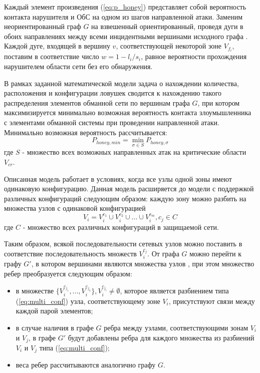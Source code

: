 Каждый элемент произведения (\ref{eq:p_honey}) представляет собой вероятность контакта нарушителя и ОбС на одном из шагов направленной атаки. Заменим неориентированный граф $G$ на взвешенный ориентированный, проведя дуги в обоих направлениях между всеми инцидентными вершинами исходного графа . Каждой дуге, входящей в вершину $v$, соответствующей некоторой зоне $V_{f_i}$, поставим в соответствие число $w = 1 - l_i / s_i$, равное вероятности прохождения нарушителем области сети  без его обнаружения.

В рамках заданной математической модели задача о нахождении количества, расположения и конфигурации ловушек сводится к нахождению такого распределения элементов обманной сети по вершинам графа $G$, при котором максимизируется минимально возможная вероятность контакта злоумышленника с элементами обманной системы при проведении направленной атаки. Минимально возможная вероятность рассчитывается:
\begin{equation}
\label{eq:p_honey_min}
P_{honey, min} = \min_{\sigma \in S} P_{honey, \sigma} 
\end{equation}
где $S$ - множество всех возможных направленных атак на критические области $V_{cr}$.

Описанная модель работает в условиях, когда все узлы одной зоны имеют одинаковую конфигурацию. Данная модель расширяется до модели с поддержкой различных конфигураций следующим образом: каждую зону можно разбить на множества узлов с одинаковой конфигурацией
\begin{equation}
\label{eq:multi_conf}
V_{i} = V_i^{c_1} \cup V_i^{c_2} \cup ... \cup V_i^{c_m}, c_j \in C
\end{equation}
где $C$ - множество всех различных конфигураций в защищаемой сети.

Таким образом, всякой последовательности сетевых узлов можно поставить в соответствие последовательность множеств $V_i^{c_j}$. От графа $G$ можно перейти к графу $G'$, в котором вершинами являются множества узлов , при этом множество ребер преобразуется следующим образом:

\begin{itemize}
	\item в множестве $\{V_i^{c_{j_1}},..., V_i^{c_{j_k}}\}, V_i^{c_{j_l}} \neq \emptyset$, которое является разбиением типа (\ref{eq:multi_conf}) узла, соответствующему зоне $V_i$, присутствуют связи между каждой парой элементов;
	\item в случае наличия в графе $G$ ребра между узлами, соответствующими зонам $V_i$ и $V_j$, в графе $G'$ будут добавлены ребра для каждого множества из разбиений $V_i$ и $V_j$ типа (\ref{eq:multi_conf});
	\item веса ребер рассчитываются аналогично графу $G$.
\end{itemize}

